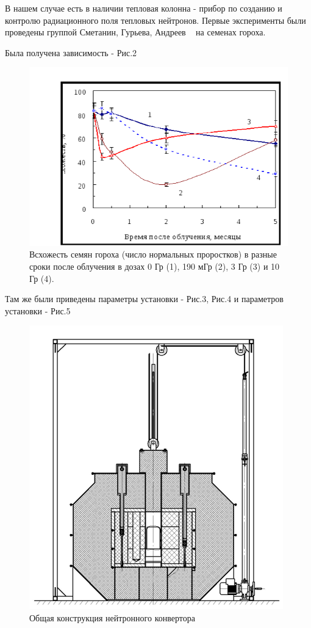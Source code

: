 \documentclass[11pt]{article}
\begin{document}
В нашем случае есть в наличии тепловая колонна - прибор по созданию и контролю радиационного поля тепловых нейтронов. Первые эксперименты были проведены группой Сметанин, Гурьева, Андреев ~\cite{andreev} на семенах гороха.

Была получена зависимость - Рис.2
\begin{figure}[!htpb]
\centering
\includegraphics[scale=0.5]{goroh}
\caption{Всхожесть семян гороха (число нормальных проростков) в разные сроки после облучения в дозах 0 Гр (1), 190 мГр (2), 3 Гр (3) и 10 Гр (4). ~\cite{andreev}}
\label{}
\end{figure}

Там же были приведены параметры установки - Рис.3, Рис.4 и параметров установки - Рис.5
\begin{figure}[!htpb]
\centering
\includegraphics[scale=0.7]{ris_1}
\caption{Общая конструкция нейтронного конвертора ~\cite{andreev}}
\label{}
\end{figure}
\end{document}
